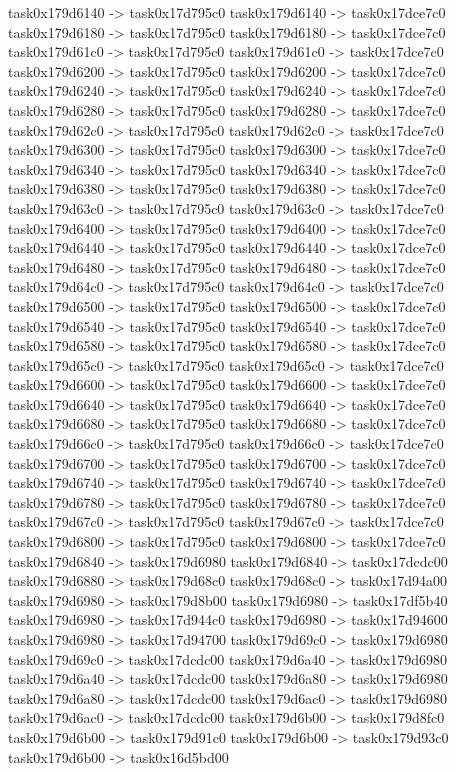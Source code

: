 {	task0x179d6140 -> task0x17d795c0
	task0x179d6140 -> task0x17dce7c0
	task0x179d6180 -> task0x17d795c0
	task0x179d6180 -> task0x17dce7c0
	task0x179d61c0 -> task0x17d795c0
	task0x179d61c0 -> task0x17dce7c0
	task0x179d6200 -> task0x17d795c0
	task0x179d6200 -> task0x17dce7c0
	task0x179d6240 -> task0x17d795c0
	task0x179d6240 -> task0x17dce7c0
	task0x179d6280 -> task0x17d795c0
	task0x179d6280 -> task0x17dce7c0
	task0x179d62c0 -> task0x17d795c0
	task0x179d62c0 -> task0x17dce7c0
	task0x179d6300 -> task0x17d795c0
	task0x179d6300 -> task0x17dce7c0
	task0x179d6340 -> task0x17d795c0
	task0x179d6340 -> task0x17dce7c0
	task0x179d6380 -> task0x17d795c0
	task0x179d6380 -> task0x17dce7c0
	task0x179d63c0 -> task0x17d795c0
	task0x179d63c0 -> task0x17dce7c0
	task0x179d6400 -> task0x17d795c0
	task0x179d6400 -> task0x17dce7c0
	task0x179d6440 -> task0x17d795c0
	task0x179d6440 -> task0x17dce7c0
	task0x179d6480 -> task0x17d795c0
	task0x179d6480 -> task0x17dce7c0
	task0x179d64c0 -> task0x17d795c0
	task0x179d64c0 -> task0x17dce7c0
	task0x179d6500 -> task0x17d795c0
	task0x179d6500 -> task0x17dce7c0
	task0x179d6540 -> task0x17d795c0
	task0x179d6540 -> task0x17dce7c0
	task0x179d6580 -> task0x17d795c0
	task0x179d6580 -> task0x17dce7c0
	task0x179d65c0 -> task0x17d795c0
	task0x179d65c0 -> task0x17dce7c0
	task0x179d6600 -> task0x17d795c0
	task0x179d6600 -> task0x17dce7c0
	task0x179d6640 -> task0x17d795c0
	task0x179d6640 -> task0x17dce7c0
	task0x179d6680 -> task0x17d795c0
	task0x179d6680 -> task0x17dce7c0
	task0x179d66c0 -> task0x17d795c0
	task0x179d66c0 -> task0x17dce7c0
	task0x179d6700 -> task0x17d795c0
	task0x179d6700 -> task0x17dce7c0
	task0x179d6740 -> task0x17d795c0
	task0x179d6740 -> task0x17dce7c0
	task0x179d6780 -> task0x17d795c0
	task0x179d6780 -> task0x17dce7c0
	task0x179d67c0 -> task0x17d795c0
	task0x179d67c0 -> task0x17dce7c0
	task0x179d6800 -> task0x17d795c0
	task0x179d6800 -> task0x17dce7c0
	task0x179d6840 -> task0x179d6980
	task0x179d6840 -> task0x17dcdc00
	task0x179d6880 -> task0x179d68c0
	task0x179d68c0 -> task0x17d94a00
	task0x179d6980 -> task0x179d8b00
	task0x179d6980 -> task0x17df5b40
	task0x179d6980 -> task0x17d944c0
	task0x179d6980 -> task0x17d94600
	task0x179d6980 -> task0x17d94700
	task0x179d69c0 -> task0x179d6980
	task0x179d69c0 -> task0x17dcdc00
	task0x179d6a40 -> task0x179d6980
	task0x179d6a40 -> task0x17dcdc00
	task0x179d6a80 -> task0x179d6980
	task0x179d6a80 -> task0x17dcdc00
	task0x179d6ac0 -> task0x179d6980
	task0x179d6ac0 -> task0x17dcdc00
	task0x179d6b00 -> task0x179d8fc0
	task0x179d6b00 -> task0x179d91c0
	task0x179d6b00 -> task0x179d93c0
	task0x179d6b00 -> task0x16d5bd00
}
